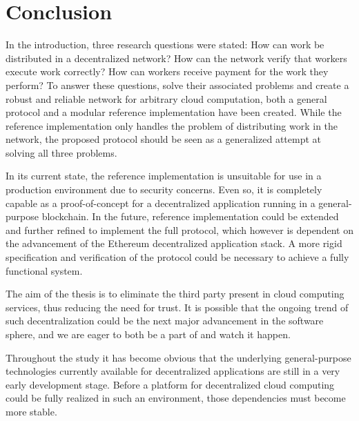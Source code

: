 \chapter{Conclusion}
In the introduction, three research questions were stated: How can work be distributed in a decentralized network? How can the network verify that workers execute work correctly? How can workers receive payment for the work they perform? To answer these questions, solve their associated problems and create a robust and reliable network for arbitrary cloud computation, both a general protocol and a modular reference implementation have been created. While the reference implementation only handles the problem of distributing work in the network, the proposed protocol should be seen as a generalized attempt at solving all three problems. 

In its current state, the reference implementation is unsuitable for use in a production environment due to security concerns. Even so, it is completely capable as a proof-of-concept for a decentralized application running in a general-purpose blockchain. In the future, reference implementation could be extended and further refined to implement the full protocol, which however is dependent on the advancement of the Ethereum decentralized application stack. A more rigid specification and verification of the protocol could be necessary to achieve a fully functional system.

The aim of the thesis is to eliminate the third party present in cloud computing services, thus reducing the need for trust. It is possible that the ongoing trend of such decentralization could be the next major advancement in the software sphere, and we are eager to both be a part of and watch it happen.

Throughout the study it has become obvious that the underlying general-purpose technologies currently available for decentralized applications are still in a very early development stage. Before a platform for decentralized cloud computing could be fully realized in such an environment, those dependencies must become more stable.
